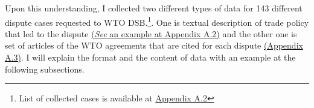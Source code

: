 \noindent Upon this understanding, 
I collected two different types of data for 143 different dispute cases requested to WTO DSB.\footnote{List of collected cases is
    available at \hyperref[sub:cited-articles-table]{Appendix A.2}
}.
One is textual description of trade policy
that led to the dispute \hyperref[sub:factual-aspect-example]{(\textit{See} an example at Appendix A.2)} and the other one is
set of articles of the WTO agreements that are
cited for each dispute \hyperref[sub:cited-articles-table]{(Appendix A.3)}.
I will explain the format and the content of
data with an example at the following subsections.













